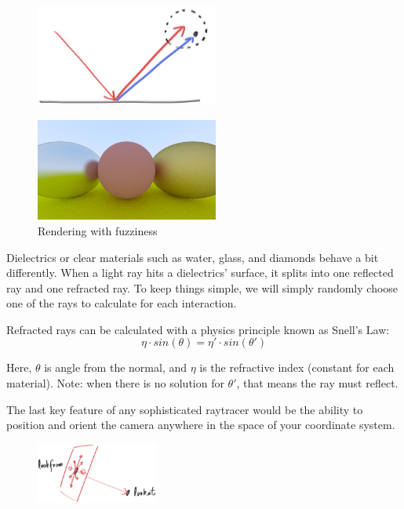 \documentclass[conference]{IEEEtran}
\begin{document}
\begin{figure}[h]
\includegraphics[width=6cm]{images/reflect_fuzzy.jpg}
\centering
\end{figure}

\begin{figure}[h]
\includegraphics[width=6cm]{images/metal_fuzzy.png}\\
Rendering with fuzziness
\centering
\end{figure}

Dielectrics or clear materials such as water, glass, and diamonds behave a bit differently. When a light ray hits a dielectrics’ surface, it splits into one reflected ray and one refracted ray. To keep things simple, we will simply randomly choose one of the rays to calculate for each interaction.

Refracted rays can be calculated with a physics principle known as Snell’s Law:
\[ \eta \cdot sin(\theta) = \eta' \cdot sin(\theta') \]

Here, $\theta$ is angle from the normal, and $\eta$ is the refractive index (constant for each material). Note: when there is no solution for $\theta'$, that means the ray must reflect.

The last key feature of any sophisticated raytracer would be the ability to position and orient the camera anywhere in the space of your coordinate system.

\begin{figure}[H]
\includegraphics[width=4cm]{images/camera1.jpg}
\centering
\end{figure}
\end{document}
